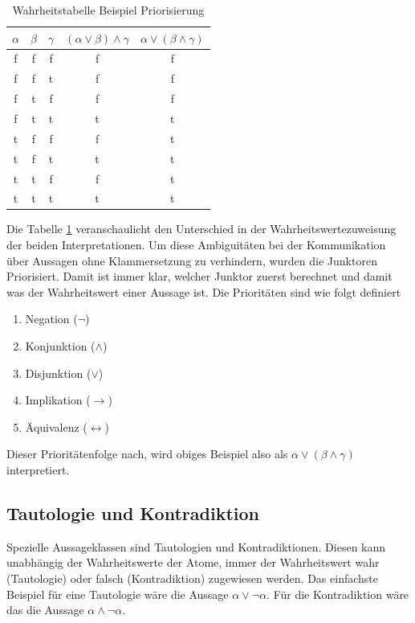\begin{table}
\begin{center}
\begin{tabular}{c|c|c|c|c}
$\alpha$ & $\beta$ & $\gamma$ & $(\alpha\vee\beta)\wedge\gamma$ & $\alpha\vee(\beta\wedge\gamma)$ \\
\hline
f & f & f & f & f \\
f & f & t & f & f \\
f & t & f & f & f \\
f & t & t & t & t \\
t & f & f & f & t \\
t & f & t & t & t \\
t & t & f & f & t \\
t & t & t & t & t \\
\end{tabular}
\end{center}
\caption{\label{tbl_prop_prio}Wahrheitstabelle Beispiel Priorisierung}
\end{table}

Die Tabelle \ref{tbl_prop_prio} veranschaulicht den Unterschied in der Wahrheitswertezuweisung der beiden Interpretationen. Um diese Ambiguitäten bei der Kommunikation über Aussagen ohne Klammersetzung zu verhindern, wurden die Junktoren Priorisiert. Damit ist immer klar, welcher Junktor zuerst berechnet und damit was der Wahrheitswert einer Aussage ist. Die Prioritäten sind wie folgt definiert \cite{KB14}
\begin{enumerate}
\item Negation ($\neg$)
\item Konjunktion ($\wedge$)
\item Disjunktion ($\vee$)
\item Implikation ($\rightarrow$)
\item Äquivalenz ($\leftrightarrow$)
\end{enumerate}
Dieser Prioritätenfolge nach, wird obiges Beispiel also als $\alpha\vee(\beta\wedge\gamma)$ interpretiert.

\subsection{Tautologie und Kontradiktion}
Spezielle Aussageklassen sind Tautologien und Kontradiktionen. Diesen kann unabhängig der Wahrheitswerte der Atome, immer der Wahrheitswert wahr (Tautologie) oder falsch (Kontradiktion) zugewiesen werden. Das einfachste Beispiel für eine Tautologie wäre die Aussage $\alpha\vee\neg\alpha$. Für die Kontradiktion wäre das die Aussage $\alpha\wedge\neg\alpha$.

